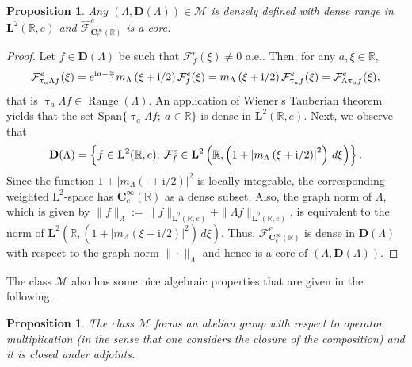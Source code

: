 \documentclass[12pt]{amsart}
\newcommand{\hlabel}{\phantomsection\label}
\numberwithin{equation}{section}
\newcommand{\bb}{\mathbb}
\newcommand{\cc}{\mathcal}
\newcommand{\hpt}[2]{#2}
\newcommand{\ov}{\overline}
\newcommand{\bmrm}[2][2]{\mathbf{#2}^{#1}}
\newcommand{\Span}{\mathrm{Span}}
\newcommand{\Range}{\operatorname{Range}}
\newcommand{\fouho}{\cc{F}^{e}}
\newcommand{\C}{\mathbf{C}}
\newcommand{\D}{\mathbf{D}}
\newcommand{\LL}{\Lambda}
\renewcommand{\i}{\mathrm{i}}
\renewcommand{\tau}{\uptau}
\newtheorem{prop}[thm]{Proposition}
\theoremstyle{definition}
\theoremstyle{assump}
\theoremstyle{remark}
\begin{document}
\begin{prop}\hlabel{dense_range_intertwining}
Any $(\LL,\D(\LL))\in\mathscr{M}$ is densely defined with dense range in $\bmrm{L}(\bb{R},e)$ %
 and $\widehat{\cc F}^e_{\!\C^\infty_c(\bb{R})}$ is a core.
\end{prop}
\begin{proof}
Let $f\in\D(\LL)$ be such that  $\fouho _{f}(\xi)\neq 0$ a.e.. Then, for any $a,\xi\in\bb{R}$,  \[ \fouho_{\tau_a\LL f}(\xi)=e^{{\rm i}a-\frac{a}{2}}m_{\LL}\left(\xi+{\rm{i}}/2\right)\fouho_f (\xi)=m_{\LL}\left(\xi+{\rm{i}}/2\right)\fouho_{\tau_a f}(\xi)=\fouho_{\LL\tau_a f}(\xi),\] that is $\tau_a\LL f\in\Range(\LL)$. An application of Wiener's Tauberian theorem yields that the set $\Span\{\tau_a\LL f; \ a\in\bb{R}\}$ is dense in $\bmrm{L}(\bb{R},e)$. Next, we observe  that
\begin{align}
\D(\LL)=\left\{f\in\bmrm{L}(\bb{R},e); \: \fouho _{f}\in\bmrm{L}\left(\bb{R}, \left(1+\left|m_\LL\left(\xi+{\rm{i}}/2\right)\right|^2\right)\,d\xi\right)\right\}.
\end{align}
Since the function $1+\left| m_\LL\left(\cdot+\i/2\right)\right|^2$ is locally integrable, the corresponding weighted $\mathrm{L}^2$-space has $\C^\infty_c(\bb{R})$ as a dense subset. Also, the graph norm of $\LL$, which is given by $\|f\|_{\LL}:=\|f\|_{\bmrm{L}(\bb{R},e)}+\|\LL f\|_{\bmrm{L}(\bb{R},e)}$, is equivalent to the norm of $\bmrm{L}\left(\bb{R}, \left(1+\left|m_\LL\left(\xi+\i/2\right)\right|^2\right)\,d\xi\right)$. Thus, $\fouho_{\C^\infty_c(\bb{R})}$  is dense in $\D(\LL)$ with respect to the graph norm $\|\cdot\|_{\LL}$ and hence is a core of $(\LL,\D(\LL)).$
\end{proof}
The class $\mathscr{M}$ also has some nice algebraic properties that are given in the following.
\begin{prop}\hlabel{m-group}
The class $\mathscr{M}$ forms an abelian group with respect to operator multiplication (\hpt{R12}{in the sense that one considers the closure of the composition}) and it is closed under adjoints.
\end{prop}
\end{document}
